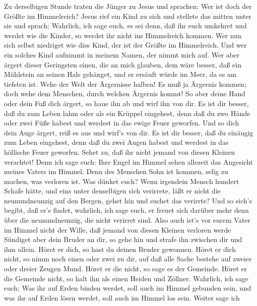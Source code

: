  Zu derselbigen Stunde traten die Jünger zu Jesus und
sprachen: Wer ist doch der Größte im Himmelreich?  Jesus
rief ein Kind zu sich und stellete das mitten unter sie  und
sprach: Wahrlich, ich sage euch, es sei denn, daß ihr euch umkehret und
werdet wie die Kinder, so werdet ihr nicht ins Himmelreich kommen.
 Wer nun sich selbst niedriget wie dies Kind, der ist der
Größte im Himmelreich.  Und wer ein solches Kind aufnimmt in
meinem Namen, der nimmt mich auf.  Wer aber ärgert dieser
Geringsten einen, die an mich glauben, dem wäre besser, daß ein
Mühlstein an seinen Hals gehänget, und er ersäuft würde im Meer, da es
am tiefsten ist.  Wehe der Welt der Ärgernisse halben! Es
muß ja Ärgernis kommen; doch wehe dem Menschen, durch welchen Ärgernis
kommt!  So aber deine Hand oder dein Fuß dich ärgert, so
haue ihn ab und wirf ihn von dir. Es ist dir besser, daß du zum Leben
lahm oder als ein Krüppel eingehest, denn daß du zwo Hände oder zwei
Füße habest und werdest in das ewige Feuer geworfen.  Und so
dich dein Auge ärgert, reiß es aus und wirf's von dir. Es ist dir
besser, daß du einäugig zum Leben eingehest, denn daß du zwei Augen
habest und werdest in das höllische Feuer geworfen.  Sehet
zu, daß ihr nicht jemand von diesen Kleinen verachtet! Denn ich sage
euch: Ihre Engel im Himmel sehen allezeit das Angesicht meines Vaters im
Himmel.  Denn des Menschen Sohn ist kommen, selig zu
machen, was verloren ist.  Was dünket euch? Wenn irgendein
Mensch hundert Schafe hätte, und eins unter denselbigen sich verirrete,
läßt er nicht die neunundneunzig auf den Bergen, gehet hin und suchet
das verirrte?  Und so sich's begibt, daß er's findet,
wahrlich, ich sage euch, er freuet sich darüber mehr denn über die
neunundneunzig, die nicht verirret sind.  Also auch ist's
vor eurem Vater im Himmel nicht der Wille, daß jemand von diesen Kleinen
verloren werde  Sündiget aber dein Bruder an dir, so gehe
hin und strafe ihn zwischen dir und ihm allein. Höret er dich, so hast
du deinen Bruder gewonnen.  Höret er dich nicht, so nimm
noch einen oder zwei zu dir, auf daß alle Sache bestehe auf zweier oder
dreier Zeugen Mund.  Höret er die nicht, so sage es der
Gemeinde. Höret er die Gemeinde nicht, so halt ihn als einen Heiden und
Zöllner.  Wahrlich, ich sage euch: Was ihr auf Erden binden
werdet, soll auch im Himmel gebunden sein, und was ihr auf Erden lösen
werdet, soll auch im Himmel los sein.  Weiter sage ich
